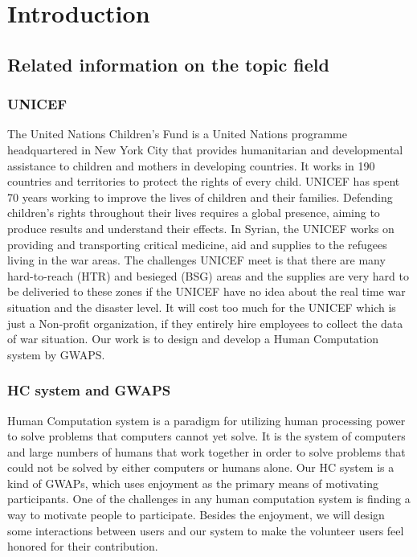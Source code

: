 \section{Introduction}
\subsection{Related information on the topic field}
	\subsubsection{UNICEF}
		The United Nations Children's Fund\cite{unicef1994state} is a United Nations programme headquartered in New York City that provides humanitarian and developmental assistance to children and mothers in developing countries. It works in 190 countries and territories to protect the rights of every child. UNICEF has spent 70 years working to improve the lives of children and their families. Defending children's rights throughout their lives requires a global presence, aiming to produce results and understand their effects. In Syrian, the UNICEF works on providing and transporting critical medicine, aid and supplies to the refugees living in the war areas. The challenges UNICEF meet is that there are many hard-to-reach (HTR) and besieged (BSG) areas and the supplies are very hard to be deliveried to these zones if the UNICEF have no idea about the real time war situation and the disaster level. It will cost too much for the UNICEF which is just a Non-profit organization, if they entirely hire employees to collect the data of war situation. Our work is to design and develop a Human Computation system by GWAPS\cite{lafourcade2015games}.
	\subsubsection{HC system and GWAPS}
		Human Computation system is a paradigm for utilizing human processing power to solve problems that computers cannot yet solve\cite{quinn2011human}. It is the system of computers and large numbers of humans that work together in order to solve problems that could not be solved by either computers or humans alone\cite{quinn2009taxonomy}.
		Our HC system is a kind of GWAPs, which uses enjoyment as the primary means of motivating participants. One of the challenges in any human computation system is finding a way to motivate people to participate\cite{quinn2011human}. Besides the enjoyment, we will design some interactions between users and our system to make the volunteer users feel honored for their contribution.
